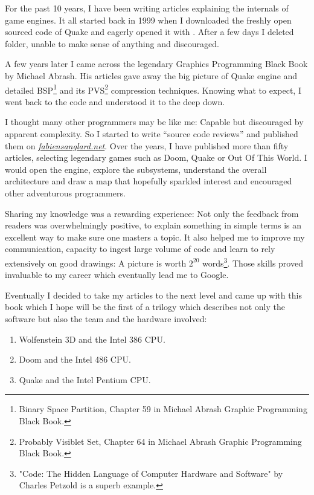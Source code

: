 \documentclass[book.tex]{subfiles}
\begin{document}
For the past 10 years, I have been writing articles explaining the internals of game engines. It all started back in 1999 when I downloaded the freshly open sourced code of \mbox{Quake} and eagerly opened it with . After a few days I deleted  folder, unable to make sense of anything and discouraged.

\bigskip

A few years later I came across the legendary Graphics Programming Black Book by Michael Abrash. His articles gave away the big picture of Quake engine and detailed BSP\footnote{Binary Space Partition, Chapter 59 in Michael Abrash Graphic Programming Black Book.} and its PVS\footnote{Probably Visiblet Set, Chapter 64 in Michael Abrash Graphic Programming Black Book.} compression techniques. Knowing what to expect, I went back to the code and understood it to the deep down.

\bigskip

I thought many other programmers may be like me: Capable but discouraged by apparent complexity. So I started to write ``source  code reviews'' and published them on 
\href{http://fabiensanglard.net}{\textit{fabiensanglard.net}}. Over the years, I have published more than fifty articles, selecting legendary games such as Doom, Quake or Out Of This World. I would open the engine, explore the subsystems, understand the overall architecture and draw a map that hopefully sparkled interest and encouraged other adventurous programmers.

\bigskip

Sharing my knowledge was a rewarding experience: Not only the feedback from readers was overwhelmingly positive, to explain something in simple terms is an excellent way to make sure one masters a topic. It also helped me to improve my communication, capacity to ingest large volume of code and learn to rely extensively on good drawings: A picture
is worth $2^{20}$ words\footnote{"Code: The Hidden Language of Computer Hardware and Software" by Charles Petzold is a superb example.}. Those skills proved invaluable to my career which eventually lead me to Google.

\bigskip

Eventually I decided to take my articles to the next level and came up with this book which I hope will be the first of a trilogy which describes not only the software but also the team and the hardware involved:

\begin{enumerate}
\item Wolfenstein 3D and the Intel 386 CPU.
\item Doom and the Intel 486 CPU.
\item Quake and the Intel Pentium CPU.
\end{enumerate}
\end{document}

